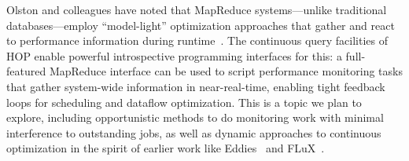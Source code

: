 Olston and colleagues have noted that MapReduce systems---unlike traditional databases---employ ``model-light'' optimization approaches that gather and react to performance information during runtime~\cite{olston-usenix08}.  The continuous query facilities of HOP enable powerful introspective programming interfaces for this: a full-featured MapReduce interface can be used to script performance monitoring tasks that gather system-wide information in near-real-time, enabling tight feedback loops for scheduling and dataflow optimization.  This is a topic we plan to explore, including opportunistic methods to do monitoring work with minimal interference to outstanding jobs, as well as dynamic approaches to continuous optimization in the spirit of earlier work like Eddies~\cite{eddies} and FLuX~\cite{flux-lb}.




